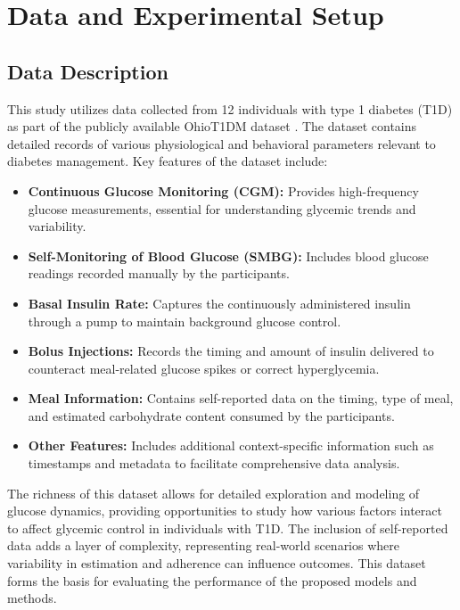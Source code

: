 
\section{Data and Experimental Setup}

\subsection{Data Description}
This study utilizes data collected from 12 individuals with type 1 diabetes (T1D) as part of the publicly available OhioT1DM dataset \cite{marling_ohiot1dm_2021}. The dataset contains detailed records of various physiological and behavioral parameters relevant to diabetes management. Key features of the dataset include:

\begin{itemize}
	\item \textbf{Continuous Glucose Monitoring (CGM):} Provides high-frequency glucose measurements, essential for understanding glycemic trends and variability.
	\item \textbf{Self-Monitoring of Blood Glucose (SMBG):} Includes blood glucose readings recorded manually by the participants.
	\item \textbf{Basal Insulin Rate:} Captures the continuously administered insulin through a pump to maintain background glucose control.
	\item \textbf{Bolus Injections:} Records the timing and amount of insulin delivered to counteract meal-related glucose spikes or correct hyperglycemia.
	\item \textbf{Meal Information:} Contains self-reported data on the timing, type of meal, and estimated carbohydrate content consumed by the participants.
	\item \textbf{Other Features:} Includes additional context-specific information such as timestamps and metadata to facilitate comprehensive data analysis.
\end{itemize}

The richness of this dataset allows for detailed exploration and modeling of glucose dynamics, providing opportunities to study how various factors interact to affect glycemic control in individuals with T1D. The inclusion of self-reported data adds a layer of complexity, representing real-world scenarios where variability in estimation and adherence can influence outcomes. This dataset forms the basis for evaluating the performance of the proposed models and methods.

